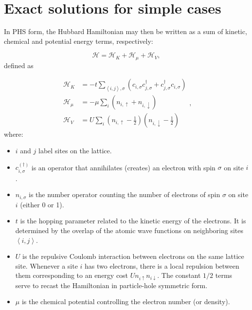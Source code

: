 \section{Exact solutions for simple cases}\label{sec:exactSolutions}

In PHS form, the Hubbard Hamiltonian may then be written as a sum of kinetic, chemical and potential energy terms, respectively:

\begin{equation}\label{eq:hubbard}
\mathcal{H} = \mathcal{H}_K + \mathcal{H}_\mu + \mathcal{H}_V ,
\end{equation}
defined as

\begin{equation}\label{eq:def_energies}
\begin{split}
\mathcal{H}_K &= -t \sum_{\left\langle i, j \right \rangle, \sigma} ( c_{i,\sigma} c_{j,\sigma}^\dagger + c_{j,\sigma}^\dagger c_{i,\sigma} ) \\
\mathcal{H}_\mu &= -\mu \sum_i ( n_{i,\uparrow} + n_{i,\downarrow} ) \\
\mathcal{H}_V &= U \sum_{i} ( n_{i,\uparrow} - \frac{1}{2} ) ( n_{i,\downarrow} - \frac{1}{2} )
\end{split} ,
\end{equation}
where:

\begin{itemize}
\item $i$ and $j$ label sites on the lattice.
\item $c_{i,\sigma}^{(\dagger)}$ is an operator that annihilates (creates) an electron with spin $\sigma$ on site $i$.
\item $n_{i,\sigma}$ is the number operator counting the number of electrons of spin $\sigma$ on site $i$ (either 0 or 1).
\item $t$ is the hopping parameter related to the kinetic energy of the electrons. It is determined by the overlap of the atomic wave functions on neighboring sites $\left\langle i, j \right\rangle$.
\item $U$ is the repulsive Coulomb interaction between electrons on the same lattice site. Whenever a site $i$ has two electrons, there is a local repulsion between them corresponding to an energy cost $U n_{i \uparrow} n_{i \downarrow}$. The constant $1/2$ terms serve to recast the Hamiltonian in particle-hole symmetric form.
\item $\mu$ is the chemical potential controlling the electron number (or density).
\end{itemize}

